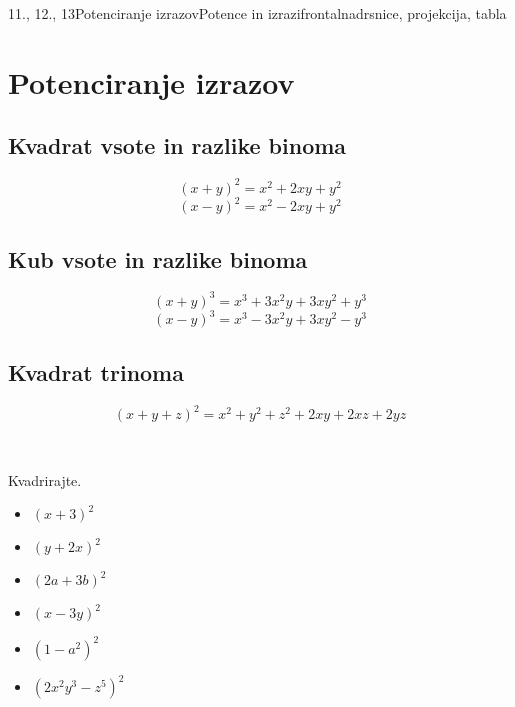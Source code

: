 \begin{priprava}{11., 12., 13}{}{Potenciranje izrazov}{Potence in izrazi}{frontalna}{drsnice, projekcija, tabla}


    \section{Potenciranje izrazov}

            
                \subsection*{Kvadrat vsote in razlike binoma}
                    $$ (x+y)^2=x^2+2xy+y^2 $$
                    $$ (x-y)^2=x^2-2xy+y^2 $$
                
        
                \subsection*{Kub vsote in razlike binoma}
                    $$ (x+y)^3=x^3+3x^2y+3xy^2+y^3 $$
                    $$ (x-y)^3=x^3-3x^2y+3xy^2-y^3 $$
                
        
                \subsection*{Kvadrat trinoma}
                    $$ (x+y+z)^2=x^2+y^2+z^2+2xy+2xz+2yz $$
                
                    ~\\
            
                    \begin{multicols}{2}
        
                \begin{naloga}
                    Kvadrirajte.
                    \begin{itemize}
                        \item $(x+3)^2$ 
                        \item $(y+2x)^2$ 
                        \item $(2a+3b)^2$ 
                        \item $(x-3y)^2$ 
                        \item $(1-a^2)^2$ 
                        \item $(2x^2y^3-z^5)^2$ 
                    \end{itemize}
                \end{naloga}



\end{multicols}
\end{priprava}
